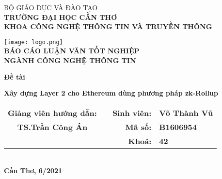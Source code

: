 \documentclass[../thesis.tex]{subfiles}
\begin{document}
\begin{titlepage}

\begin{center}

BỘ GIÁO DỤC VÀ ĐÀO TẠO\\
\textbf{TRƯỜNG ĐẠI HỌC CẦN THƠ\\}
\textbf{KHOA CÔNG NGHỆ THÔNG TIN VÀ TRUYỀN THÔNG\\[1cm]}

\texttt{[image: logo.png]}\\[1cm]

\textbf{BÁO CÁO LUẬN VĂN TỐT NGHIỆP\\}
\textbf{NGÀNH CÔNG NGHỆ THÔNG TIN\\[2cm]}

\begin{large}
\textbf{Đề tài\\[0.5cm]}
\end{large}
\textbf{{\LARGE Xây dựng Layer 2 cho Ethereum dùng phương pháp zk-Rollup}}
\\[4cm]

\begin{tabular}{ c c r l }
 \textbf{Giảng viên hướng dẫn:} & & \textbf{Sinh viên:} & \textbf{Võ Thành Vũ}\\ 
 \textbf{TS.Trần Công Án} & & \textbf{Mã số:} & \textbf{B1606954}\\  
 & & \textbf{Khoá:} & \textbf{42}
\end{tabular}
\\[4cm]

\textbf{Cần Thơ, 6/2021}

\end{center}

\end{titlepage}
\end{document}
